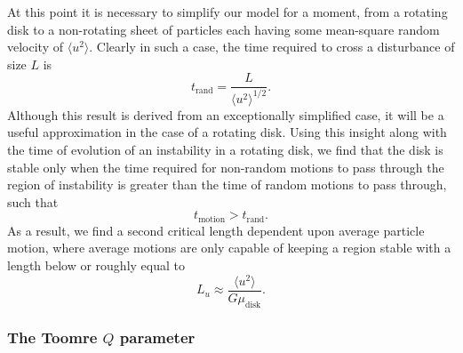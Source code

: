 \documentclass[aps,pra, twocolumn]{revtex4-1}
\begin{document}
At this point it is necessary to simplify our model for a moment, from a rotating disk to a non-rotating sheet of particles each having some mean-square random velocity of $\langle u^2 \rangle$. Clearly in such a case, the time required to cross a disturbance of size $L$ is
\begin{equation}
t_\text{rand} = \frac{L}{\langle u^2 \rangle^{1/2}}.
\end{equation}
Although this result is derived from an exceptionally simplified case, it will be a useful approximation in the case of a rotating disk.  Using this insight along with the time of evolution of an instability in a rotating disk, we find that the disk is stable only when the time required for non-random motions to pass through the region of instability is greater than the time of random motions to pass through, such that
\begin{equation}
t_\text{motion} > t_\text{rand}.
\end{equation}
As a result, we find a second critical length dependent upon average particle motion, where average motions are only capable of keeping a region stable with a length below or roughly equal to
\begin{equation}
L_u \approx \frac{\langle u^2 \rangle}{G\mu_\text{disk}}. \label{crit2.1}
\end{equation}

\subsubsection{\label{section 3.1.3} The Toomre $Q$ parameter}
\end{document}
